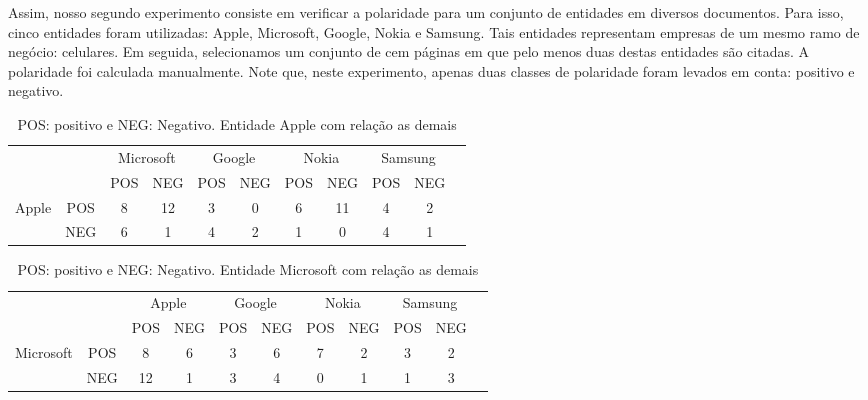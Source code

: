 \documentclass[a4paper,12pt]{article}
\begin{document}
Assim, nosso segundo experimento consiste em verificar a polaridade para um conjunto de entidades em diversos documentos. Para isso, cinco entidades foram utilizadas: Apple, Microsoft, Google, Nokia e Samsung. Tais entidades representam empresas de um mesmo ramo de negócio: celulares. Em seguida, selecionamos um conjunto de cem páginas em que pelo menos duas destas entidades são citadas. A polaridade foi calculada manualmente. Note que, neste experimento, apenas duas classes de polaridade foram levados em conta: positivo e negativo.

\begin{table}
\begin{center}
  \begin{tabular}{cc|c|c|c|c|c|c|c|c|l}
  \cline{3-10}
  & & \multicolumn{2}{|c|}{Microsoft} & \multicolumn{2}{|c|}{Google} & \multicolumn{2}{|c|}{Nokia} & \multicolumn{2}{|c|}{Samsung} \\ \cline{3-10}
  & & \multicolumn{1}{|c|}{POS} & \multicolumn{1}{|c|}{NEG} & \multicolumn{1}{|c|}{POS} & \multicolumn{1}{|c|}{NEG} & \multicolumn{1}{|c|}{POS} & \multicolumn{1}{|c|}{NEG} & \multicolumn{1}{|c|}{POS} & \multicolumn{1}{|c|}{NEG} \\ \cline{1-10}
  \multicolumn{1}{|c|}{\multirow{2}{*}{Apple}} &
  \multicolumn{1}{|c|}{POS} & 8 & 12 & 3 & 0 & 6 & 11 & 4 & 2  \\ \cline{2-10}
  \multicolumn{1}{|c|}{}                        &
  \multicolumn{1}{|c|}{NEG} & 6 & 1 & 4 & 2 & 1 & 0 & 4  & 1   \\ \cline{1-10}
  \end{tabular}
  \caption{POS: positivo e NEG: Negativo. Entidade Apple com relação as demais}
  \label{tab:multi1}
\end{center}
\end{table}

\begin{table}
\begin{center}
  \begin{tabular}{cc|c|c|c|c|c|c|c|c|l}
  \cline{3-10}
  & & \multicolumn{2}{|c|}{Apple} & \multicolumn{2}{|c|}{Google} & \multicolumn{2}{|c|}{Nokia} & \multicolumn{2}{|c|}{Samsung} \\ \cline{3-10}
  & & \multicolumn{1}{|c|}{POS} & \multicolumn{1}{|c|}{NEG} & \multicolumn{1}{|c|}{POS} & \multicolumn{1}{|c|}{NEG} & \multicolumn{1}{|c|}{POS} & \multicolumn{1}{|c|}{NEG} & \multicolumn{1}{|c|}{POS} & \multicolumn{1}{|c|}{NEG} \\ \cline{1-10}
  \multicolumn{1}{|c|}{\multirow{2}{*}{Microsoft}} &
  \multicolumn{1}{|c|}{POS} & 8 & 6 & 3 & 6 & 7 & 2 & 3 & 2  \\ \cline{2-10}
  \multicolumn{1}{|c|}{}                        &
  \multicolumn{1}{|c|}{NEG} & 12 & 1 & 3 & 4 & 0 & 1 & 1  & 3   \\ \cline{1-10}
  \end{tabular}
  \caption{POS: positivo e NEG: Negativo. Entidade Microsoft com relação as demais}
  \label{tab:multi2}
\end{center}
\end{table}
\end{document}
